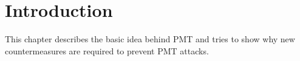 \section{Introduction}
\label{sec:introduction}
This chapter describes the basic idea behind \gls{PMT} and tries to show why new countermeasures are required to prevent \gls{PMT} attacks.






